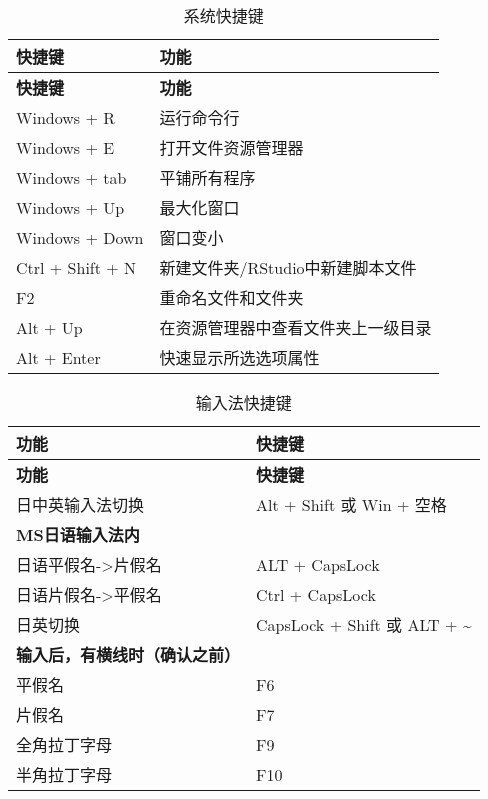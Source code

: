 \documentclass[]{ctexbook}
\begin{document}
\begin{longtable}[]{@{}ll@{}}
\caption{\label{tab:sys-short} 系统快捷键}\tabularnewline
\toprule
\textbf{快捷键} & \textbf{功能}\tabularnewline
\midrule
\endfirsthead
\toprule
\textbf{快捷键} & \textbf{功能}\tabularnewline
\midrule
\endhead
Windows + R & 运行命令行\tabularnewline
Windows + E & 打开文件资源管理器\tabularnewline
Windows + tab & 平铺所有程序\tabularnewline
Windows + Up & 最大化窗口\tabularnewline
Windows + Down & 窗口变小\tabularnewline
Ctrl + Shift + N & 新建文件夹/RStudio中新建脚本文件\tabularnewline
F2 & 重命名文件和文件夹\tabularnewline
Alt + Up & 在资源管理器中查看文件夹上一级目录\tabularnewline
Alt + Enter & 快速显示所选选项属性\tabularnewline
\bottomrule
\end{longtable}

\begin{longtable}[]{@{}ll@{}}
\caption{\label{tab:input-short} 输入法快捷键}\tabularnewline
\toprule
\textbf{功能} & \textbf{快捷键}\tabularnewline
\midrule
\endfirsthead
\toprule
\textbf{功能} & \textbf{快捷键}\tabularnewline
\midrule
\endhead
日中英输入法切换 & Alt + Shift 或 Win + 空格\tabularnewline
\textbf{MS日语输入法内} &\tabularnewline
日语平假名-\textgreater 片假名 & ALT + CapsLock\tabularnewline
日语片假名-\textgreater 平假名 & Ctrl + CapsLock\tabularnewline
日英切换 & CapsLock + Shift 或 ALT + \textasciitilde{}\tabularnewline
\textbf{输入后，有横线时（确认之前）} &\tabularnewline
平假名 & F6\tabularnewline
片假名 & F7\tabularnewline
全角拉丁字母 & F9\tabularnewline
半角拉丁字母 & F10\tabularnewline
\bottomrule
\end{longtable}




\backmatter
\printindex
\end{document}
